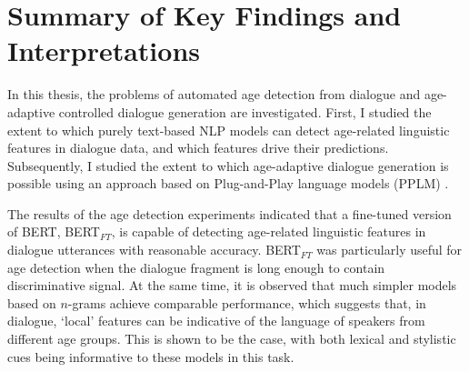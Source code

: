 \section{Summary of Key Findings and Interpretations}

In this thesis, the problems of automated age detection from dialogue and age-adaptive controlled dialogue generation are investigated. First, I studied the extent to which purely text-based NLP models can detect age-related linguistic features in dialogue data, and which features drive their predictions. Subsequently, I studied the extent to which age-adaptive dialogue generation is possible using an approach based on Plug-and-Play language models (PPLM) \citep{dathathri2019plug}.

The results of the age detection experiments indicated that a fine-tuned version of BERT, BERT$_{FT}$, is capable of detecting age-related linguistic features in dialogue utterances with reasonable accuracy. BERT$_{FT}$ was particularly useful for age detection when the dialogue fragment is long enough to contain discriminative signal. At the same time, it is observed that much simpler models based on $n$-grams achieve comparable performance, which suggests that, in dialogue, ‘local’ features can be indicative of the language of speakers from different age groups. This is shown to be the case, with both lexical and stylistic cues being informative to these models in this task.



